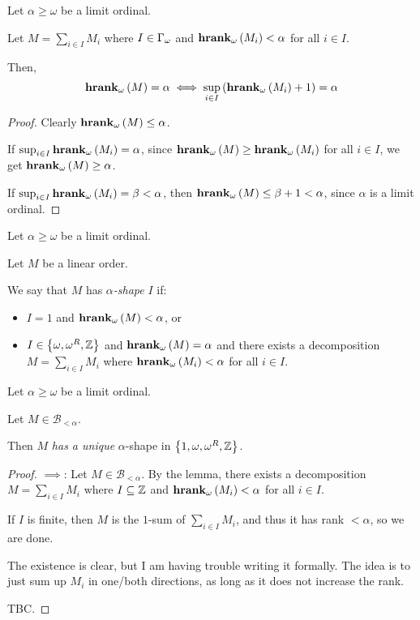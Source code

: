 \begin{lemma}
  Let $\alpha \ge \omega$ be a limit ordinal.

  Let $M = \sum_{i \in I} M_i$ where $I \in \Gamma_{\omega}$ and $\mathbf{hrank}_{\omega}\left( M_i \right) < \alpha$
  for all $i \in I$.

  Then,
  $$\mathbf{hrank}_{\omega}\left( M \right) = \alpha \iff \sup_{i \in I} \left( {\mathbf{hrank}_{\omega}\left( M_i \right)+1} \right) = \alpha$$
\end{lemma}

\begin{proof}
  Clearly $\mathbf{hrank}_{\omega}\left( M \right) \le \alpha$.
  
  If $\sup_{i \in I}{\mathbf{hrank}_{\omega}\left( M_i \right)} = \alpha$,
  since $\mathbf{hrank}_{\omega}\left( M \right) \ge \mathbf{hrank}_{\omega}\left( M_i \right)$ for all $i \in I$,
  we get $\mathbf{hrank}_{\omega}\left( M \right) \ge \alpha$.

  If $\sup_{i \in I}{\mathbf{hrank}_{\omega}\left( M_i \right)} = \beta < \alpha$,
  then $\mathbf{hrank}_{\omega}\left( M \right) \le \beta + 1 < \alpha$, since 
  $\alpha$ is a limit ordinal.
\end{proof}

\begin{definition}
  Let $\alpha \ge \omega$ be a limit ordinal.

  Let $M$ be a linear order.

  We say that $M$ has \emph{$\alpha$-shape} $I$ if:

  \begin{itemize}
    \item $I = 1$ and $\mathbf{hrank}_{\omega}\left( M \right) < \alpha$, or
    \item $I \in \left\{ {\omega, \omega^R, \mathbb{Z}} \right\}$ and $\mathbf{hrank}_{\omega}\left( M \right) = \alpha$ and
      there exists a decomposition $M = \sum_{i \in I} M_i$ where
      $\mathbf{hrank}_{\omega}\left( M_i \right) < \alpha$ for all $i \in I$.
  \end{itemize}
\end{definition}


\begin{lemma}
  Let $\alpha \ge \omega$ be a limit ordinal.

  Let $M \in \mathcal{B}_{< \alpha}$.
  
  Then $M$ \emph{has a unique} $\alpha$-shape in $\left\{ {1, \omega, \omega^R, \mathbb{Z}} \right\}$.
\end{lemma}

\begin{proof}
  $\implies$: Let $M \in \mathcal{B}_{< \alpha}$. By the lemma,
  there exists a decomposition $M = \sum_{i \in I} M_i$ where
  $I \subseteq \mathbb{Z}$ and $\mathbf{hrank}_{\omega}\left( M_i \right) < \alpha$ for all $i \in I$.

  If $I$ is finite, then $M$ is the $1$-sum of $\sum_{i \in I} M_i$,
  and thus it has rank $< \alpha$, so we are done.

  The existence is clear, but I am having trouble writing
  it formally. The idea is to just sum up $M_i$ in one/both directions,
  as long as it does not increase the rank.

  TBC.


\end{proof}
